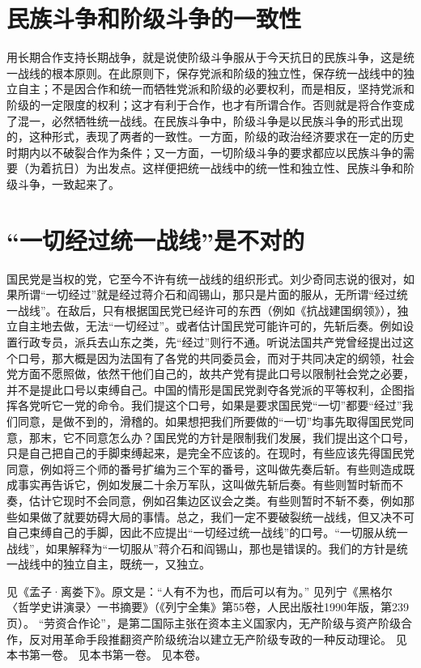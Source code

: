 \section{民族斗争和阶级斗争的一致性}

用长期合作支持长期战争，就是说使阶级斗争服从于今天抗日的民族斗争，这是统一战线的根本原则。在此原则下，保存党派和阶级的独立性，保存统一战线中的独立自主；不是因合作和统一而牺牲党派和阶级的必要权利，而是相反，坚持党派和阶级的一定限度的权利；这才有利于合作，也才有所谓合作。否则就是将合作变成了混一，必然牺牲统一战线。在民族斗争中，阶级斗争是以民族斗争的形式出现的，这种形式，表现了两者的一致性。一方面，阶级的政治经济要求在一定的历史时期内以不破裂合作为条件；又一方面，一切阶级斗争的要求都应以民族斗争的需要（为着抗日）为出发点。这样便把统一战线中的统一性和独立性、民族斗争和阶级斗争，一致起来了。

\section{“一切经过统一战线”是不对的}

国民党是当权的党，它至今不许有统一战线的组织形式。刘少奇同志说的很对，如果所谓“一切经过”就是经过蒋介石和阎锡山，那只是片面的服从，无所谓“经过统一战线”。在敌后，只有根据国民党已经许可的东西（例如《抗战建国纲领》），独立自主地去做，无法“一切经过”。或者估计国民党可能许可的，先斩后奏。例如设置行政专员，派兵去山东之类，先“经过”则行不通。听说法国共产党曾经提出过这个口号，那大概是因为法国有了各党的共同委员会，而对于共同决定的纲领，社会党方面不愿照做，依然干他们自己的，故共产党有提此口号以限制社会党之必要，并不是提此口号以束缚自己。中国的情形是国民党剥夺各党派的平等权利，企图指挥各党听它一党的命令。我们提这个口号，如果是要求国民党“一切”都要“经过”我们同意，是做不到的，滑稽的。如果想把我们所要做的“一切”均事先取得国民党同意，那末，它不同意怎么办？国民党的方针是限制我们发展，我们提出这个口号，只是自己把自己的手脚束缚起来，是完全不应该的。在现时，有些应该先得国民党同意，例如将三个师的番号扩编为三个军的番号，这叫做先奏后斩。有些则造成既成事实再告诉它，例如发展二十余万军队，这叫做先斩后奏。有些则暂时斩而不奏，估计它现时不会同意，例如召集边区议会之类。有些则暂时不斩不奏，例如那些如果做了就要妨碍大局的事情。总之，我们一定不要破裂统一战线，但又决不可自己束缚自己的手脚，因此不应提出“一切经过统一战线”的口号。“一切服从统一战线”，如果解释为“一切服从”蒋介石和阎锡山，那也是错误的。我们的方针是统一战线中的独立自主，既统一，又独立。


\begin{maonote}
见《孟子·离娄下》。原文是：“人有不为也，而后可以有为。”
见列宁《黑格尔〈哲学史讲演录〉一书摘要》（《列宁全集》第55卷，人民出版社1990年版，第239页）。
“劳资合作论”，是第二国际主张在资本主义国家内，无产阶级与资产阶级合作，反对用革命手段推翻资产阶级统治以建立无产阶级专政的一种反动理论。
见本书第一卷。
见本书第一卷。
见本卷。
\end{maonote}
